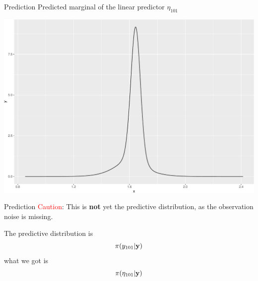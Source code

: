 \documentclass[
  ignorenonframetext,
]{beamer}
\newenvironment{Shaded}{\begin{snugshade}}{\end{snugshade}}
\newcommand{\AttributeTok}[1]{\textcolor[rgb]{0.77,0.63,0.00}{#1}}
\newcommand{\DecValTok}[1]{\textcolor[rgb]{0.00,0.00,0.81}{#1}}
\newcommand{\FunctionTok}[1]{\textcolor[rgb]{0.00,0.00,0.00}{#1}}
\newcommand{\NormalTok}[1]{#1}
\newcommand{\OtherTok}[1]{\textcolor[rgb]{0.56,0.35,0.01}{#1}}
\newcommand{\SpecialCharTok}[1]{\textcolor[rgb]{0.00,0.00,0.00}{#1}}
\begin{document}
\begin{frame}[fragile]{Prediction}
\protect\hypertarget{prediction-2}{}
Predicted marginal of the linear predictor \(\eta_{101}\)

\begin{Shaded}
\end{Shaded}

\begin{center}\includegraphics[width=0.6\linewidth]{Part2_RINLA_files/figure-beamer/unnamed-chunk-36-1} \end{center}
\end{frame}

\begin{frame}{Prediction}
\protect\hypertarget{prediction-3}{}
\textcolor{red}{Caution}: This is \textbf{not} yet the predictive
distribution, as the observation noise is missing.

The predictive distribution is \[
\pi(y_{101}|\bf{y})
\] what we got is \[
\pi(\eta_{101}|\bf{y})
\]
\end{frame}
\end{document}
